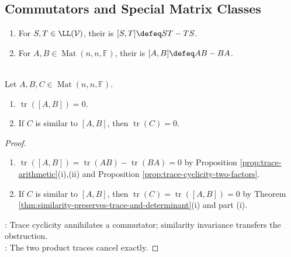 \subsection{Commutators and Special Matrix Classes}

\begin{definition} \label{def:operator-and-matrix-commutator} 
\begin{enumerate}[label=(\roman*)]
\setlength{\itemsep}{0pt}
\item For $S,T\in\LL(\mathcal{V})$, their  is $[S,T]\defeq ST-TS$.
\item For $A,B\in\operatorname{Mat}(n,n,\mathbb{F})$, their  is $[A,B]\defeq AB-BA$.
\end{enumerate}
\end{definition}

\begin{proposition} \label{prop:commutators-have-zero-trace} \\
Let $A,B,C\in\operatorname{Mat}(n,n,\mathbb{F})$.
\begin{enumerate}[label=(\roman*)]
\setlength{\itemsep}{0pt}
\item $\operatorname{tr}([A,B])=0$.
\item If $C$ is similar to $[A,B]$, then $\operatorname{tr}(C)=0$.
\end{enumerate}
\begin{proof}
\begin{enumerate}[label=(\roman*)]
\setlength{\itemsep}{0pt}
\item $\operatorname{tr}([A,B])=\operatorname{tr}(AB)-\operatorname{tr}(BA)=0$ by Proposition \ref{prop:trace-arithmetic}(i),(ii) and Proposition \ref{prop:trace-cyclicity-two-factors}.
\item If $C$ is similar to $[A,B]$, then $\operatorname{tr}(C)=\operatorname{tr}([A,B])=0$ by Theorem \ref{thm:similarity-preserves-trace-and-determinant}(i) and part (i).
\end{enumerate}
: Trace cyclicity annihilates a commutator; similarity invariance transfers the obstruction.\\
: The two product traces cancel exactly.
\end{proof}
\end{proposition}

